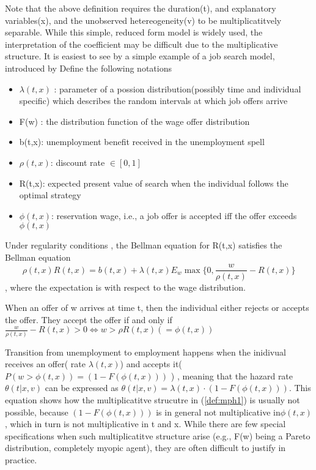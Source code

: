 \documentclass[uplatex,dvipdfmx]{jsarticle}
\begin{document}
Note that the above definition requires the duration(t), and explanatory variables(x), and the unobserved hetereogeneity(v) to be multiplicatitvely separable. While this simple, reduced form model is widely used, the interpretation of the coefficient may be difficult due to the multiplicative structure. It is easiest to see by a simple example of a job search model, introduced by \cite{mortensen1986job,mortensen1999new,van2001duration}
Define the following notations 
\begin{itemize}
    \item $\lambda(t,x)$ : parameter of a possion distribution(possibly time and individual specific) which describes the random intervals at which job offers arrive
    \item F(w) : the distribution function of the wage offer distribution
    \item b(t,x): unemployment benefit received in the unemployment spell
    \item $\rho(t,x)$: discount rate $\in [0,1]$
    \item R(t,x): expected present value of search when the individual follows the optimal strategy 
    \item $\phi(t,x)$: reservation wage, i.e., a job offer is accepted iff the offer exceeds $\phi(t,x)$ 
\end{itemize}
Under regularity conditions , the Bellman equation for R(t,x) satisfies the Bellman equation
\begin{equation}
    \rho(t,x) R(t,x) = b(t,x) + \lambda(t,x) E_w \max \{ 0, \frac{w}{\rho(t,x)} - R(t,x)\}
\end{equation},
where the expectation is with respect to the wage distribution. 

When an offer of w arrives at time t, then the individual either rejects or accepts the offer. They accept the offer if and only if  $\frac{w}{\rho(t,x)} - R(t,x) >0 \iff w > \rho R(t,x) (=\phi(t,x))$

Transition from unemployment to employment happens when the inidivual receives an offer( rate $\lambda(t,x)$) and accepts it($P( w > \phi(t,x) ) = (1-F(\phi(t,x)))$ ) , meaning that the hazard rate $\theta(t|x,v)$ can be expressed as $\theta(t|x,v) = \lambda(t,x) \cdot (1-F(\phi(t,x)))$. 
This equation shows how the multiplicatitve strucutre in  (\ref{def:mph1}) is usually not possible, because $(1 - F (\phi(t,x)))$ is in general not multiplicative in$ \phi(t,x)$ , which in turn is not multiplicative in t and x. 
While there are few special specifications when such multiplicatitve structure arise
(e.g., F(w) being a Pareto distribution, completely myopic agent), they are often difficult to justify in practice. 
\end{document}
